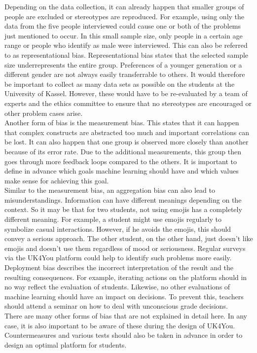 Depending on the data collection, it can already happen that smaller groups of people are excluded or stereotypes are reproduced.
For example, using only the data from the five people interviewed could cause one or both of the problems just mentioned to occur.
In this small sample size, only people in a certain age range or people who identify as male were interviewed.
This can also be referred to as representational bias.
Representational bias states that the selected sample size underrepresents the entire group.
Preferences of a younger generation or a different gender are not always easily transferrable to others.
It would therefore be important to collect as many data sets as possible on the students at the University of Kassel.
However, these would have to be re-evaluated by a team of experts and the ethics committee to ensure that no stereotypes are encouraged or other problem cases arise.\\

Another form of bias is the measurement bias.
This states that it can happen that complex constructs are abstracted too much and important correlations can be lost.
It can also happen that one group is observed more closely than another because of its error rate.
Due to the additional measurements, this group then goes through more feedback loops compared to the others.
It is important to define in advance which goals machine learning should have and which values make sense for achieving this goal.\\

Similar to the measurement bias, an aggregation bias can also lead to misunderstandings.
Information can have different meanings depending on the context.
So it may be that for two students, not using emojis has a completely different meaning.
For example, a student might use emojis regularly to symbolize casual interactions.
However, if he avoids the emojis, this should convey a serious approach.
The other student, on the other hand, just doesn't like emojis and doesn't use them regardless of mood or seriousness.
Regular surveys via the UK4You platform could help to identify such problems more easily.\\

Deployment bias describes the incorrect interpretation of the result and the resulting consequences.
For example, iterating actions on the platform should in no way reflect the evaluation of students.
Likewise, no other evaluations of machine learning should have an impact on decisions.
To prevent this, teachers should attend a seminar on how to deal with unconscious grade decisions.\\

There are many other forms of bias that are not explained in detail here.
In any case, it is also important to be aware of these during the design of UK4You.
Countermeasures and various tests should also be taken in advance in order to design an optimal platform for students.

